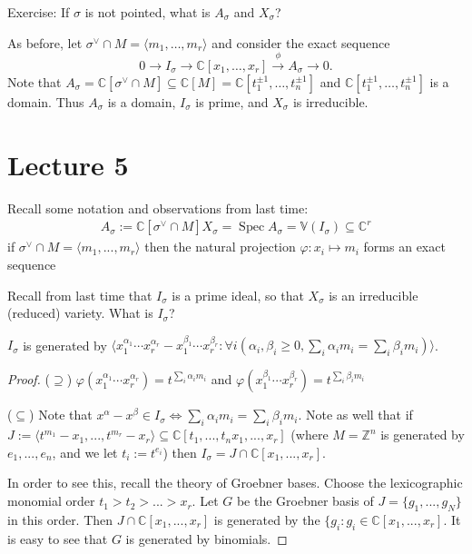 \documentclass[a4paper,12pt]{amsart}
\newcommand{\ZZ}{\mathbb{Z}}
\newcommand{\CC}{\mathbb{C}}
\newcommand{\bb}[1]{{\mathbb{#1}}}
\DeclareMathOperator{\Spec}{Spec}
\begin{document}
Exercise: If $\sigma$ is not pointed, what is $A_\sigma$ and $X_\sigma$?

As before, let $\sigma^\vee \cap M = \langle m_1, \dots, m_r \rangle$ and consider the exact sequence
\[
0 \to I_\sigma \to \CC[x_1, \dots, x_r] \overset{\phi}{\to} A_\sigma \to 0.
\]
Note that $A_\sigma = \CC[\sigma^\vee \cap M] \subseteq \CC[M] = \CC[t_1^{\pm 1}, \dots, t_n^{\pm 1}]$ and $\CC[t_1^{\pm 1}, \dots, t_n^{\pm 1}]$ is a domain.
Thus $A_\sigma$ is a domain, $I_\sigma$ is prime, and $X_\sigma$ is irreducible.


\newpage
\section{Lecture 5}

Recall some notation and observations from last time:
\begin{align*}
A_\sigma := \CC[\sigma^\vee \cap M]
X_\sigma = \Spec A_\sigma = \bb{V}(I_\sigma) \subseteq \CC^r
\end{align*}
if $\sigma^\vee \cap M = \langle m_1, ..., m_r \rangle$ then the natural projection $\varphi: x_i \mapsto m_i$ forms an exact sequence
\begin{center}
\end{center}

Recall from last time that $I_\sigma$ is a prime ideal, so that $X_\sigma$ is an irreducible (reduced) variety. What is $I_\sigma$?

\begin{Proposition}
$I_\sigma$ is generated by $\langle x_1^{\alpha_1} \cdots x_r^{\alpha_r} - x_1^{\beta_1} \cdots x_r^{\beta_r} : \forall i (\alpha_i, \beta_i \geq 0, \sum_i \alpha_i m_i = \sum_i \beta_i m_i) \rangle $.
\end{Proposition}
\begin{proof}

($\supseteq$) $\varphi(x_1^{\alpha_1} \cdots x_r^{\alpha_r}) = t^{\sum_i \alpha_i m_i}$ and $\varphi(x_1^{\beta_1} \cdots x_r^{\beta_r}) = t^{\sum_i \beta_i m_i}$

($\subseteq$) Note that $x^\alpha - x^\beta \in I_\sigma \iff \sum_i \alpha_i m_i = \sum_i \beta_i m_i$. Note as well that if $J := \langle t^{m_1} - x_1, ..., t^{m_r} - x_r\rangle \subseteq \CC[t_1, ..., t_n x_1, ..., x_r]$ (where $M = \ZZ^n$ is generated by $e_1, ..., e_n$, and we let $t_i := t^{e_i}$) then $I_\sigma = J \cap \CC[x_1, ..., x_r]$.

In order to see this, recall the theory of Groebner bases. Choose the lexicographic monomial order $t_1 > t_2 > ... > x_r$. Let $G$ be the Groebner basis of $J = \{g_1, ..., g_N\}$ in this order. Then $J \cap \CC[x_1, ..., x_r]$ is generated by the $\{g_i : g_i \in \CC[x_1, ..., x_r]$. It is easy to see that $G$ is generated by binomials.
\end{proof}
\end{document}
